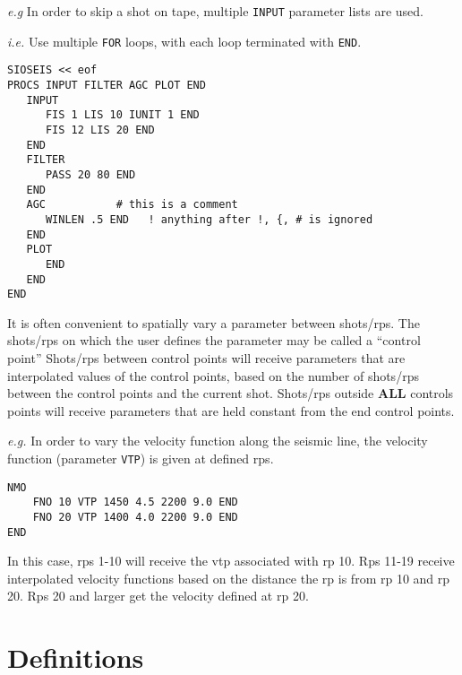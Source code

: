 \textit{e.g}  In order to skip a \gls{shot} on tape, multiple \texttt{INPUT}
parameter lists are used.

\textit{i.e.} Use multiple \texttt{FOR} loops, with each loop terminated with
\texttt{END}.

\begin{verbatim}
SIOSEIS << eof
PROCS INPUT FILTER AGC PLOT END
   INPUT
      FIS 1 LIS 10 IUNIT 1 END
      FIS 12 LIS 20 END
   END
   FILTER
      PASS 20 80 END
   END
   AGC           # this is a comment
      WINLEN .5 END   ! anything after !, {, # is ignored
   END
   PLOT
      END
   END
END
\end{verbatim}

It is often convenient to spatially vary a parameter between \glspl{shot}/\glspl{rp}.  The
\glspl{shot}/\glspl{rp} on which the user defines the parameter may be called a ``control
point''  Shots/\glspl{rp} between control points will receive parameters that are
interpolated values of the control points, based on the number of \glspl{shot}/\glspl{rp}
between the control points and the current \gls{shot}.  Shots/\glspl{rp} outside
\textbf{ALL} controls points will receive parameters that are held constant
from the end control points.

\textit{e.g.} In order to vary the velocity function along the seismic line,
the velocity function (parameter \texttt{VTP}) is given at defined \glspl{rp}.
\begin{verbatim}
NMO
    FNO 10 VTP 1450 4.5 2200 9.0 END
    FNO 20 VTP 1400 4.0 2200 9.0 END
END
\end{verbatim}

In this case, \glspl{rp} 1-10 will receive the vtp associated with \gls{rp} 10.
Rps 11-19 receive interpolated velocity functions based on the distance
the \gls{rp} is from \gls{rp} 10 and \gls{rp} 20.  Rps 20 and larger get the velocity
defined at \gls{rp} 20.

\chapter{Definitions}

